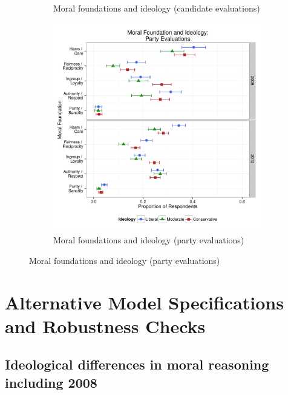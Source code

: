 \documentclass[12pt]{article}
\begin{document}
\begin{figure}[h]
\begin{subfigure}[t]{0.49\textwidth}
\caption{Moral foundations and ideology (candidate evaluations)}\label{fig:appC2cand}
  \end{subfigure}
  \begin{subfigure}[t]{0.49\textwidth}
    \includegraphics[scale=.35]{../calc/fig/appC3party.pdf}
\caption{Moral foundations and ideology (party evaluations)}\label{fig:appC3party}
  \end{subfigure}
\end{figure}


\clearpage
\section{Alternative Model Specifications and Robustness Checks}\label{app:robust}
\renewcommand\thefigure{\thesection.\arabic{figure}}
\renewcommand\thetable{\thesection.\arabic{table}}
\setcounter{figure}{0}
\setcounter{table}{0}


\subsection{Ideological differences in moral reasoning including 2008}
\end{document}
